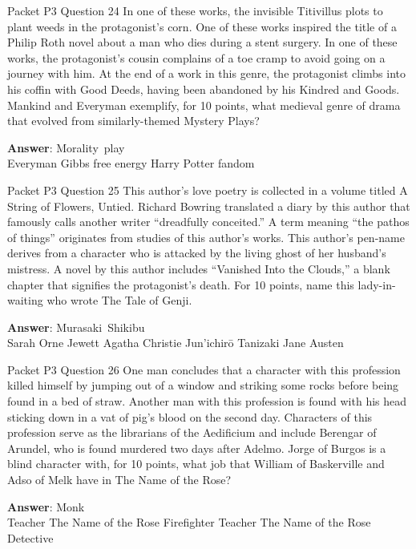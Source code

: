\begin{frame}{Packet P3 Question 24}
In one of these works, the invisible Titivillus plots to plant weeds in the protagonist’s corn. One of these works inspired the title of a Philip Roth novel about a man who dies during a stent surgery. In one of these works, the protagonist’s cousin complains of a toe cramp to avoid going on a journey with him. At the end of a work in this genre, the protagonist climbs into his coffin with Good Deeds, having been abandoned by his Kindred and Goods. Mankind and Everyman exemplify,   for 10 points, what medieval genre of   drama that evolved from similarly-themed Mystery Plays?      

\textbf{Answer}: Morality\ play\\
 Everyman
 Gibbs free energy
 Harry Potter fandom
\end{frame}

\begin{frame}{Packet P3 Question 25}
This author’s love poetry is collected in a volume titled A String of Flowers, Untied. Richard Bowring translated a diary by this author that famously calls another writer “dreadfully   conceited.” A term meaning “the pathos of things” originates from studies of this author’s works. This author’s pen-name derives from a character who is attacked by the living ghost of her husband’s mistress. A novel by this author includes “Vanished Into the Clouds,” a blank chapter that signifies the protagonist’s death. For 10 points, name this lady-in-waiting who wrote The   Tale of Genji.      

\textbf{Answer}: Murasaki\ Shikibu\\
 Sarah Orne Jewett
 Agatha Christie
 Jun'ichirō Tanizaki
 Jane Austen
\end{frame}

\begin{frame}{Packet P3 Question 26}
One man concludes that a character with this profession killed himself by jumping out of a window and striking some rocks before being found in a bed of straw. Another man with this profession is found with his head sticking down in a vat of pig's blood on the second day. Characters of this profession serve as the librarians   of the Aedificium and include Berengar of Arundel, who is found murdered two days after Adelmo. Jorge of Burgos is a blind character with, for 10 points, what job that William of Baskerville and Adso of Melk have in   The Name of the Rose?        

\textbf{Answer}: Monk\\
 Teacher
 The Name of the Rose
 Firefighter
 Teacher
 The Name of the Rose
 Detective
\end{frame}

